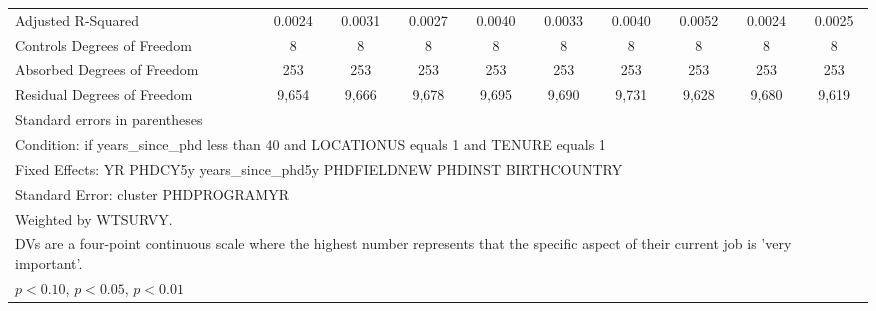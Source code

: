 \begin{table}[htbp]
\begin{tabular}{l*{9}{c}}
Adjusted R-Squared&      0.0024         &      0.0031         &      0.0027         &      0.0040         &      0.0033         &      0.0040         &      0.0052         &      0.0024         &      0.0025         \\
Controls Degrees of Freedom&           8         &           8         &           8         &           8         &           8         &           8         &           8         &           8         &           8         \\
Absorbed Degrees of Freedom&         253         &         253         &         253         &         253         &         253         &         253         &         253         &         253         &         253         \\
Residual Degrees of Freedom&       9,654         &       9,666         &       9,678         &       9,695         &       9,690         &       9,731         &       9,628         &       9,680         &       9,619         \\
\hline\hline
\multicolumn{10}{l}{\footnotesize Standard errors in parentheses}\\
\multicolumn{10}{l}{\footnotesize Condition: if years\_since\_phd less than 40 and LOCATIONUS equals 1 and TENURE equals 1}\\
\multicolumn{10}{l}{\footnotesize Fixed Effects: YR PHDCY5y years\_since\_phd5y PHDFIELDNEW PHDINST BIRTHCOUNTRY}\\
\multicolumn{10}{l}{\footnotesize Standard Error: cluster PHDPROGRAMYR}\\
\multicolumn{10}{l}{\footnotesize Weighted by WTSURVY.}\\
\multicolumn{10}{l}{\footnotesize DVs are a four-point continuous scale where the highest number represents that the specific aspect of their current job is 'very important'.}\\
\multicolumn{10}{l}{\footnotesize \sym{*} \(p<0.10\), \sym{**} \(p<0.05\), \sym{***} \(p<0.01\)}\\
\end{tabular}
\end{table}
